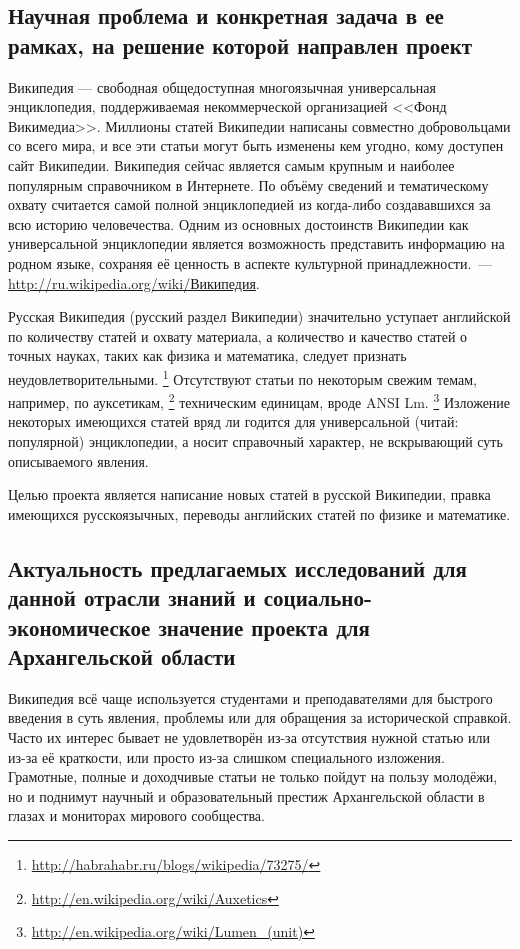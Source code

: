 \subsection{Научная проблема и конкретная задача в ее рамках, на решение которой направлен проект}
Википедия --- свободная общедоступная многоязычная универсальная энциклопедия,
поддерживаемая некоммерческой организацией <<Фонд Викимедиа>>. Миллионы
статей Википедии написаны совместно добровольцами со всего мира, и
все эти статьи могут быть изменены кем угодно, кому доступен сайт
Википедии. Википедия сейчас является самым крупным и наиболее популярным
справочником в Интернете. По объёму сведений и тематическому охвату
считается самой полной энциклопедией из когда-либо создававшихся за
всю историю человечества. Одним из основных достоинств Википедии как
универсальной энциклопедии является возможность представить информацию
на родном языке, сохраняя её ценность в аспекте культурной принадлежности.~---
\href{http://ru.wikipedia.org/wiki/\%D0\%92\%D0\%B8\%D0\%BA\%D0\%B8\%D0\%BF\%D0\%B5\%D0\%B4\%D0\%B8\%D1\%8F}{http://ru.wikipedia.org/wiki/Википедия}.

Русская Википедия (русский раздел Википедии) значительно уступает
английской по количеству статей и охвату материала, а количество и
качество статей о точных науках, таких как физика и математика, следует
признать неудовлетворительными.%
\footnote{\href{http://habrahabr.ru/blogs/wikipedia/73275/}{http://habrahabr.ru/blogs/wikipedia/73275/}%
} Отсутствуют статьи по некоторым свежим темам, например, по ауксетикам,%
\footnote{\href{http://en.wikipedia.org/wiki/Auxetics}{http://en.wikipedia.org/wiki/Auxetics}%
} техническим единицам, вроде ANSI Lm.%
\footnote{\href{http://en.wikipedia.org/wiki/Lumen_\%28unit\%29}{http://en.wikipedia.org/wiki/Lumen\_{}(unit)}%
} Изложение некоторых имеющихся статей вряд ли годится для универсальной
(читай: популярной) энциклопедии, а носит справочный характер, не
вскрывающий суть описываемого явления.

Целью проекта является написание новых статей в русской Википедии,
правка имеющихся русскоязычных, переводы английских статей по физике
и математике.


\subsection{Актуальность предлагаемых исследований
для данной отрасли знаний и социально-экономическое значение проекта для Архангельской области}

Википедия всё чаще используется студентами и преподавателями для быстрого
введения в суть явления, проблемы или для обращения за исторической
справкой. Часто их интерес бывает не удовлетворён из-за отсутствия
нужной статью или из-за её краткости, или просто из-за слишком специального
изложения. Грамотные, полные и доходчивые статьи не только пойдут
на пользу молодёжи, но и поднимут научный и образовательный престиж
Архангельской области в глазах и мониторах мирового сообщества.


